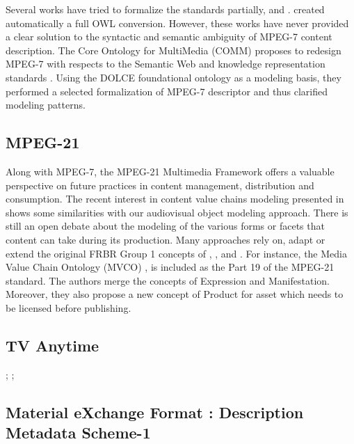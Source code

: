 Several works have tried to formalize the standards partially, \cite{Hunter2001} and \cite{Tsinaraki2004}. \cite{Garcia2005} created automatically a full OWL conversion. However, these works have never provided a clear solution to the syntactic and semantic ambiguity of MPEG-7 content description. The Core Ontology for MultiMedia (COMM) proposes to redesign MPEG-7 with respects to the Semantic Web and knowledge representation standards \cite{Arndt2007}. Using the DOLCE foundational ontology as a modeling basis, they performed a selected formalization of MPEG-7 descriptor and thus clarified modeling patterns. 




\subsection{MPEG-21}
Along with MPEG-7, the MPEG-21 Multimedia Framework \cite{Burnett2003} offers a valuable perspective on future practices in content management, distribution and consumption. The recent interest in content value chains modeling presented in \cite{Garcia2010} shows some similarities with our audiovisual object modeling approach. There is still an open debate about the modeling of the various forms or facets that content can take during its production. Many approaches rely on, adapt or extend the original FRBR Group 1 concepts of , ,  and . 
For instance, the Media Value Chain Ontology (MVCO) \cite{Rodriguez-Doncel2009}, \cite{Rodriguez-Doncel2010} is included as the Part 19 of the MPEG-21 standard. 
The authors merge the concepts of Expression and Manifestation. Moreover, they also propose a new concept of Product for asset which needs to be licensed before publishing. 




\subsection{TV Anytime}
\cite{Evain2000} ; \cite{Tsinaraki2004} ; \cite{Tsinaraki2005}

\subsection{Material eXchange Format : Description Metadata Scheme-1}
\cite{Marcos2009}

